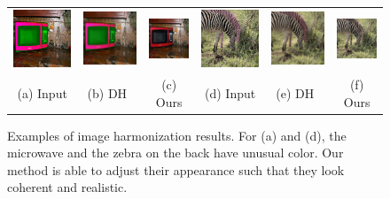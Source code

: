 \begin{figure}[h!]
\centering
\small
\begin{tabular}{cccccc}

  \includegraphics[width=.16\textwidth]{figures/hm/000000319696_input_image.jpg}&
  \includegraphics[width=.16\textwidth]{figures/hm/000000319696_synthesized_image.jpg}&
  \includegraphics[width=.16\textwidth]{figures/hm/000000319696_synthesized_image-1.jpg}&
  \includegraphics[width=.16\textwidth]{figures/hm/000000159311_input_image.jpg}&
  \includegraphics[width=.16\textwidth]{figures/hm/000000159311_synthesized_image.jpg}&
  \includegraphics[width=.16\textwidth]{figures/hm/000000159311_synthesized_image-1.jpg} \\
  (a) Input & (b) DH~\cite{tsai2017deep}  & (c) Ours & (d) Input & (e) DH~\cite{tsai2017deep}  & (f) Ours \\
\end{tabular}
\caption{Examples of image harmonization results. For (a) and (d), the microwave and the zebra on the back have unusual color. Our method is able to adjust their appearance such that they look coherent and realistic. }
\label{fig:harm}
\vspace{-10pt}
\end{figure}

